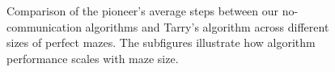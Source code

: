 \begin{figure}[H]
    \qquad
    \caption{Comparison of the pioneer's average steps between our no-communication algorithms and Tarry's algorithm across different sizes of perfect mazes. The subfigures illustrate how algorithm performance scales with maze size.}
    \label{fig_no_comm_steps_all_sizes_maze}
\end{figure}

